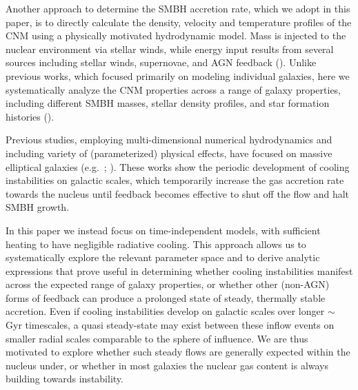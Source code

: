 \documentclass[usenatbib,fleqn]{mn2e}
\begin{document}

Another approach to determine the SMBH accretion rate, which we adopt
in this paper, is to directly calculate the density, velocity and
temperature profiles of the CNM using a physically motivated
hydrodynamic model.  Mass is injected to the nuclear environment via
stellar winds, while energy input results from several sources
including stellar winds, supernovae, and AGN feedback
(\citealt{Quataert:2004a,De-ColleGuillochon+:2012a,ShcherbakovWong+:2014a}).
Unlike previous works, which focused primarily on modeling individual galaxies, here
we systematically analyze the CNM properties across a range of galaxy properties, including different SMBH masses, stellar density profiles, and
star formation histories (\citealt{WangMerritt:2004a}).

Previous studies, employing multi-dimensional numerical hydrodynamics and
including variety of (parameterized) physical effects, have focused on
massive elliptical galaxies (e.g.~\citealt{Ciotti&Ostriker07};
\citealt{Ciotti+10}).  These works show the periodic
development of cooling instabilities on galactic scales, which
temporarily increase the gas accretion rate towards the nucleus until
feedback becomes effective to shut off the flow and halt
SMBH growth.  

In this paper we instead focus on time-independent models, with
sufficient heating to have negligible radiative cooling.  This
approach allows us to systematically explore the relevant parameter
space and to derive analytic expressions that prove useful in
determining whether cooling instabilities manifest across the expected
range of galaxy properties, or whether other (non-AGN) forms of
feedback can produce a prolonged state of steady, thermally stable
accretion.  Even if cooling instabilities develop on galactic scales
over longer $\sim$ Gyr timescales, a quasi steady-state may exist
between these inflow events on smaller radial scales comparable to the
sphere of influence.  We are thus motivated to explore whether such
steady flows are generally expected within the nucleus under, or
whether in most galaxies the nuclear gas content is always building
towards instability.
\end{document}

